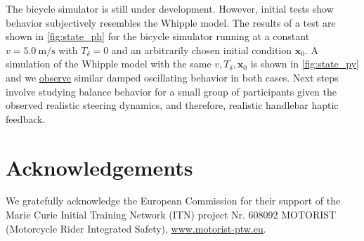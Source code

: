 \documentclass{icsc}
\newcommand{\state}{\bm{x}}
\newcommand{\steer}{\delta}
\begin{document}
The bicycle simulator is still under development.
However, initial tests show behavior subjectively resembles the Whipple model.
The results of a test are shown in \autoref{fig:state_ph} for the bicycle simulator running at a constant
$v = \SI[per-mode=symbol]{5.0}{\meter\per\second}$ with $T_{\steer} = 0$ and an arbitrarily chosen initial condition
$\state_0$.
A simulation of the Whipple model with the same $v, T_\steer, \state_0$ is shown in \autoref{fig:state_py} and we
\href{https://youtu.be/ekhSaXHQY9w}{observe} similar damped oscillating behavior in both cases.
Next steps involve studying balance behavior for a small group of participants given the observed realistic steering
dynamics, and therefore, realistic handlebar haptic feedback.

\section{Acknowledgements}

We gratefully acknowledge the European Commission for their support of the Marie Curie Initial Training Network (ITN)
project Nr. 608092 MOTORIST (Motorcycle Rider Integrated Safety),
\mbox{\href{http://www.motorist-ptw.eu}{www.motorist-ptw.eu}}.

\footnotesize

\end{document}
